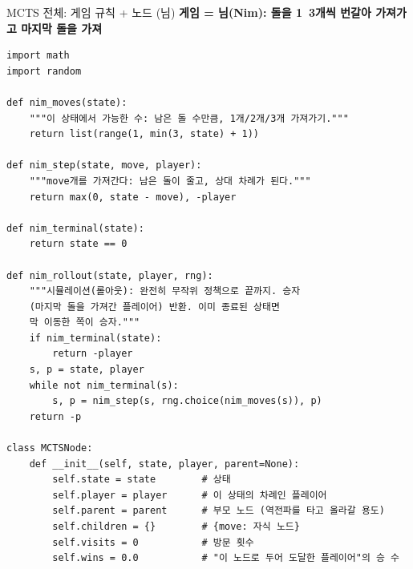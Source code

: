 \begin{frame}[fragile]{MCTS 전체: 게임 규칙 + 노드 (님)}
  \textbf{게임 = 님(Nim): 돌을 1~3개씩 번갈아 가져가고 마지막 돌을 가져}
\begin{lstlisting}
import math
import random

def nim_moves(state):
    """이 상태에서 가능한 수: 남은 돌 수만큼, 1개/2개/3개 가져가기."""
    return list(range(1, min(3, state) + 1))

def nim_step(state, move, player):
    """move개를 가져간다: 남은 돌이 줄고, 상대 차례가 된다."""
    return max(0, state - move), -player

def nim_terminal(state):
    return state == 0

def nim_rollout(state, player, rng):
    """시뮬레이션(롤아웃): 완전히 무작위 정책으로 끝까지. 승자
    (마지막 돌을 가져간 플레이어) 반환. 이미 종료된 상태면
    막 이동한 쪽이 승자."""
    if nim_terminal(state):
        return -player
    s, p = state, player
    while not nim_terminal(s):
        s, p = nim_step(s, rng.choice(nim_moves(s)), p)
    return -p

class MCTSNode:
    def __init__(self, state, player, parent=None):
        self.state = state        # 상태
        self.player = player      # 이 상태의 차례인 플레이어
        self.parent = parent      # 부모 노드 (역전파를 타고 올라갈 용도)
        self.children = {}        # {move: 자식 노드}
        self.visits = 0           # 방문 횟수
        self.wins = 0.0           # "이 노드로 두어 도달한 플레이어"의 승 수
\end{lstlisting}

\end{frame}
